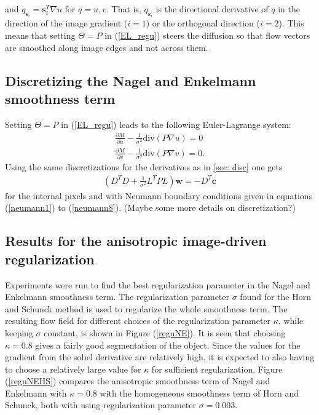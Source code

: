 and $q_{\textbf{s}_i} = \textbf{s}_i^T \nabla u$ for $q = u, v$. That is, $q_{\textbf{s}_i}$ is the directional derivative of $q$ in the direction of the image gradient ($i=1$) or the orthogonal direction ($i=2$). This means that setting $\Theta=P$ in (\ref{EL_regu}) steers the diffusion so that flow vectors are smoothed along image edges and not across them.

\subsection{Discretizing the Nagel and Enkelmann smoothness term}
Setting $\Theta=P$ in (\ref{EL_regu}) leads to the following Euler-Lagrange system:
\begin{align*}
\frac{\partial M}{\partial u} - \frac{1}{\sigma^2} \text{div}(P \nabla u) = 0 \\
\frac{\partial M}{\partial v} - \frac{1}{\sigma^2} \text{div}(P \nabla v)= 0.
\end{align*}
Using the same discretizations for the derivatives as in \ref{sec: disc} one gets
\begin{align*}
(D^T D + \frac{1}{\sigma^2} L^TPL) \textbf{w} = - D^T \textbf{c}
\end{align*}
for the internal pixels and with Neumann boundary conditions given in equations (\ref{neumann1}) to (\ref{neumann8}). (Maybe some more details on discretization?)

\subsection{Results for the anisotropic image-driven regularization}
Experiments were run to find the best regularization parameter in the Nagel and Enkelmann smoothness term. The regularization parameter $\sigma$ found for the Horn and Schunck method is used to regularize the whole smoothness term. The resulting flow field for different choices of the regularization parameter $\kappa$, while keeping $\sigma$ constant, is shown in Figure (\ref{reguNE}). It is seen that choosing $\kappa = 0.8$ gives a fairly good segmentation of the object. Since the values for the gradient from the sobel derivative are relatively high, it is expected to also having to choose a relatively large value for $\kappa$ for sufficient regularization. Figure (\ref{reguNEHS}) compares the anisotropic smoothness term of Nagel and Enkelmann with $\kappa = 0.8$ with the homogeneous smoothness term of Horn and Schunck, both with using regularization parameter $\sigma = 0.003$. 

